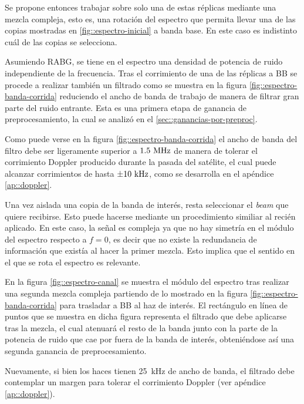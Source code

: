 \documentclass[../../main.tex]{subfiles}
\begin{document}
Se propone entonces trabajar sobre solo una de estas réplicas mediante una mezcla compleja, esto es, una rotación del espectro que permita llevar una de las copias mostradas en \ref{fig::espectro-inicial} a banda base. En este caso es indistinto cuál de las copias se selecciona. 

Asumiendo RABG, se tiene en el espectro una densidad de potencia de ruido independiente de la frecuencia. 
Tras el corrimiento de una de las réplicas a BB se procede a realizar también un filtrado como se muestra en la figura \ref{fig::espectro-banda-corrida} reduciendo el ancho de banda de trabajo de manera de filtrar gran parte del ruido entrante. Esta es una primera etapa de ganancia de preprocesamiento, la cual se analizó en el \cref{sec::ganancias-por-preproc}. 

Como puede verse en la figura \ref{fig::espectro-banda-corrida} el ancho de banda del filtro debe ser ligeramente superior a $1.5~\textrm{MHz}$ de manera de tolerar el corrimiento Doppler producido durante la pasada del satélite, el cual puede alcanzar corrimientos de hasta $\pm 10~\textrm{kHz}$, como se desarrolla en el apéndice \ref{ap::doppler}.

Una vez aislada una copia de la banda de interés, resta seleccionar el \textit{beam} que quiere recibirse. Esto puede hacerse mediante un procedimiento similiar al recién aplicado. En este caso, la señal es compleja ya que no hay simetría en el módulo del espectro respecto a $f = 0$, es decir que no existe la redundancia de información que existía al hacer la primer mezcla. Esto implica que el sentido en el que se rota el espectro es relevante.

En la figura \ref{fig::espectro-canal} se muestra el módulo del espectro tras realizar una segunda mezcla compleja partiendo de lo mostrado en la figura \ref{fig::espectro-banda-corrida} para trasladar a BB al haz de interés. El rectángulo en línea de puntos que se muestra en dicha figura representa el filtrado que debe aplicarse tras la mezcla, el cual atenuará el resto de la banda junto con la parte de la potencia de ruido que cae por fuera de la banda de interés, obteniéndose así una segunda ganancia de preprocesamiento.

Nuevamente, si bien los haces tienen 25~kHz de ancho de banda, el filtrado debe contemplar un margen para tolerar el corrimiento Doppler (ver apéndice \ref{ap::doppler}).
\end{document}
